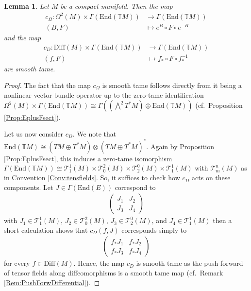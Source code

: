 \documentclass[12pt,a4paper]{article}
\theoremstyle{plain}
\newtheorem{lemma}[theorem]{Lemma}
\theoremstyle{definition}
\newcommand{\tens}{\otimes}
\newcommand{\Forms}[1]{\Omega^{#1}(M)}
\newcommand{\Diff}{\mathrm{Diff}(M)}
\newcommand{\GenTM}{\mathbb TM}
\newcommand{\tensf}[2]{\mathcal{T}^{#1}_{#2}(M)}
\begin{document}
\begin{lemma}
Let $M$ be a compact manifold. Then the map 
\begin{align*}
    c_\Omega:\Forms{2}\times \Gamma(\mathrm{End}(\GenTM))&\longrightarrow \Gamma(\mathrm{End}(\GenTM))\\
    (B,F)&\longmapsto e^B\circ F\circ e^{-B} 
\end{align*}
and the map
\begin{align*}
    c_D:\Diff\times \Gamma(\mathrm{End}(\GenTM))&\longrightarrow \Gamma(\mathrm{End}(\GenTM))\\
    (f,F)&\longmapsto f_*\circ F\circ f_*^{-1}
\end{align*}
are smooth tame.
\end{lemma}
\begin{proof}
The fact that the map $c_\Omega$ is smooth tame follows directly from it being a nonlinear vector bundle operator up to the zero-tame identification 
$\Forms{2}\times \Gamma(\mathrm{End}(\GenTM))\cong \Gamma((\bigwedge^2T^*M)\oplus\mathrm{End}(\GenTM))$ (cf.~Proposition \ref{Prop:EplusFsect}).

Let us now consider $c_D$. We note that $\mathrm{End}(\GenTM)\cong (TM\oplus T^*M)\tens (TM\oplus T^*M)^*$. Again by Proposition \ref{Prop:EplusFsect}, this induces a zero-tame isomorphism
$\Gamma(\mathrm{End}(\GenTM))\cong \tensf{1}{1}\times \tensf{2}{0}\times \tensf{0}{2}\times \tensf{1}{1}$ with $\tensf{n}{m}$ as in Convention \ref{Conv:tensfields}. So, it suffices to check how $c_D$ acts on these components. Let $J\in \Gamma(\mathrm{End}(E))$ correspond to
\begin{align*}
    \begin{pmatrix}
        J_1 & J_2\\
        J_3 & J_4
\end{pmatrix}
\end{align*}
with $J_1\in \tensf{1}{1}$, $J_2\in \tensf{2}{0}$, $J_3\in \tensf{0}{2}$, and $J_4\in \tensf{1}{1}$ then a short calculation shows that $c_D(f,J)$ corresponds simply to
\begin{align*}
    \begin{pmatrix}
        f_*J_1 & f_*J_2\\
        f_*J_3 & f_*J_4
\end{pmatrix}
\end{align*}
for every $f\in \Diff$. Hence, the map $c_D$ is smooth tame as the push forward of tensor fields along diffeomorphisms is a smooth tame map (cf.~Remark \ref{Rem:PushForwDifferential}).
\end{proof}
\end{document}
